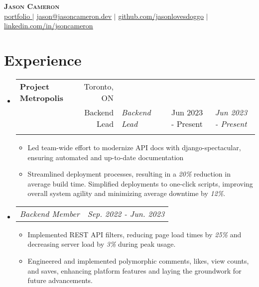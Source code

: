 \documentclass[letterpaper,11pt]{article}
\makeatletter
\newcommand{\resumeItem}[1]{
    \item\small{
            {#1 \vspace{-2pt}}
    }
}
\newcommand{\resumeSubheading}[4]{%
    \vspace{-2pt}\item
    \begin{tabular*}{0.97\textwidth}[t]{@{}l@{\extracolsep{\fill}}r@{}}
        \textbf{#1} & #2 \\
        \ifx & #3 &%
        \else
        \textit{\small#3} &
        \fi
        \ifx & #4 &%
        \else
        \textit{\small #4} \\
        \fi
    \end{tabular*}\vspace{-7pt}%
}
\newcommand{\resumeSubSubheading}[2]{
    \item
    \begin{tabular*}{0.97\textwidth}{l@{\extracolsep{\fill}}r}
        \textit{\small#1} & \textit{\small #2} \\
    \end{tabular*}\vspace{-7pt}
}
\newcommand{\resumeSubHeadingListStart}{\begin{itemize}[leftmargin=0.15in, label={}]}
\newcommand{\resumeSubHeadingListEnd}{\end{itemize}}
\newcommand{\resumeItemListStart}{\begin{itemize}}
\newcommand{\resumeItemListEnd}{\end{itemize}\vspace{-5pt}}
\makeatother
\begin{document}
\begin{center}
\textbf{\Huge \scshape Jason Cameron} \\ \vspace{1pt}
\underline{\href{https://jasoncameron.dev}{\raisebox{-0.05\height}{\faDesktop} portfolio $|$}}
\underline{\href{mailto:jason@jasoncameron.dev}{\raisebox{-0.05\height}{\faEnvelope} jason@jasoncameron.dev}} $|$
\underline{\href{https://github.com/jasonlovesdoggo}{\raisebox{-0.05\height}{\faGithub} github.com/jasonlovesdoggo}} $|$
\underline{\href{https://www.linkedin.com/in/jsoncameron/}{\raisebox{-0.05\height}{\faLinkedin} linkedin.com/in/jsoncameron}}
\end{center}

\section{Experience}
\resumeSubHeadingListStart
\resumeSubheading
{Project Metropolis}{Toronto, ON}
{Backend Lead}{Jun 2023 - Present}

\resumeItemListStart
\resumeItem{
Led team-wide effort to modernize API docs with django-spectacular, ensuring automated and up-to-date documentation
}
\resumeItem{
Streamlined deployment processes, resulting in a \emph{20\%} reduction in average build time. Simplified deployments to one-click scripts, improving overall system agility and minimizing average downtime by \emph{12\%}.
}
\resumeSubHeadingListEnd
\resumeSubSubheading
{Backend Member}{Sep. 2022 - Jun. 2023}
\resumeItemListStart
\resumeItem{
Implemented REST API filters, reducing page load times by \emph{25\%} and decreasing server load by \emph{3\%} during peak usage.}  %
\resumeItem{Engineered and implemented polymorphic comments, likes, view counts, and saves, enhancing platform features and laying the groundwork for future advancements.}
\resumeItemListEnd
\resumeSubHeadingListEnd
\end{document}

